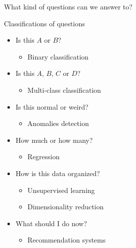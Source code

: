 \documentclass[11pt,xcolor=svgnames]{beamer}
\begin{document}
\begin{frame}{What kind of questions can we answer to?}
  \begin{block}{Classifications of questions}
    \begin{itemize}
    \item Is this $A$ or $B$?
      \begin{itemize}
      \item Binary classification
      \end{itemize}
    \item Is this $A$, $B$, $C$ or $D$?
      \begin{itemize}
      \item Multi-class classification
      \end{itemize}
    \item Is this normal or weird?
      \begin{itemize}
      \item Anomalies detection
      \end{itemize}
    \item How much or how many?
      \begin{itemize}
      \item Regression
      \end{itemize}
    \item How is this data organized?
      \begin{itemize}
      \item Unsupervised learning
      \item Dimensionality reduction
      \end{itemize}
    \item What should I do now?
      \begin{itemize}
      \item Recommendation systems
      \end{itemize}
    \end{itemize}
  \end{block}
\end{frame}

\end{document}
